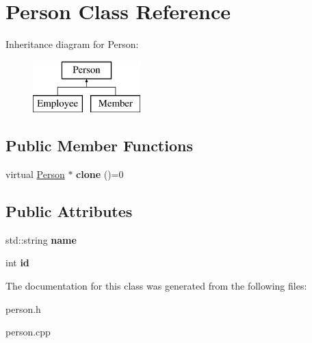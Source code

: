 \hypertarget{class_person}{\section{Person Class Reference}
\label{class_person}
}
Inheritance diagram for Person\-:\begin{figure}[H]
\begin{center}
\leavevmode
\includegraphics[height=2.000000cm]{class_person}
\end{center}
\end{figure}
\subsection*{Public Member Functions}
\begin{DoxyCompactItemize}
\item 
\hypertarget{class_person_a1b1099a7fe99bd551e8785d7458a560f}{virtual \hyperlink{class_person}{Person} $\ast$ {\bfseries clone} ()=0}\label{class_person_a1b1099a7fe99bd551e8785d7458a560f}

\end{DoxyCompactItemize}
\subsection*{Public Attributes}
\begin{DoxyCompactItemize}
\item 
\hypertarget{class_person_a7594663aadc0de77616506df8a2f4128}{std\-::string {\bfseries name}}\label{class_person_a7594663aadc0de77616506df8a2f4128}

\item 
\hypertarget{class_person_aec48a92f614a854ff380a15eb8e2f479}{int {\bfseries id}}\label{class_person_aec48a92f614a854ff380a15eb8e2f479}

\end{DoxyCompactItemize}


The documentation for this class was generated from the following files\-:\begin{DoxyCompactItemize}
\item 
person.\-h\item 
person.\-cpp\end{DoxyCompactItemize}
